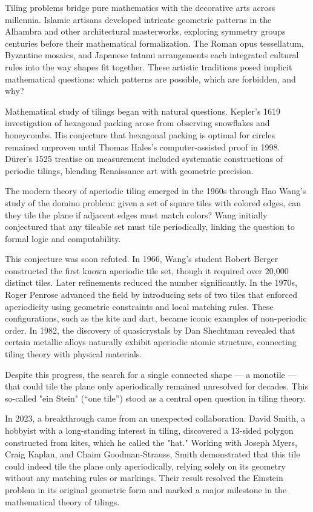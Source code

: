 \begin{historical}
Tiling problems bridge pure mathematics with the decorative arts across millennia. Islamic artisans developed intricate geometric patterns in the Alhambra and other architectural masterworks, exploring symmetry groups centuries before their mathematical formalization. The Roman opus tessellatum, Byzantine mosaics, and Japanese tatami arrangements each integrated cultural rules into the way shapes fit together. These artistic traditions posed implicit mathematical questions: which patterns are possible, which are forbidden, and why?

Mathematical study of tilings began with natural questions. Kepler's 1619 investigation of hexagonal packing arose from observing snowflakes and honeycombs. His conjecture that hexagonal packing is optimal for circles remained unproven until Thomas Hales's computer-assisted proof in 1998. Dürer's 1525 treatise on measurement included systematic constructions of periodic tilings, blending Renaissance art with geometric precision.

The modern theory of aperiodic tiling emerged in the 1960s through Hao Wang's study of the domino problem: given a set of square tiles with colored edges, can they tile the plane if adjacent edges must match colors? Wang initially conjectured that any tileable set must tile periodically, linking the question to formal logic and computability.

This conjecture was soon refuted. In 1966, Wang’s student Robert Berger constructed the first known aperiodic tile set, though it required over 20,000 distinct tiles. Later refinements reduced the number significantly. In the 1970s, Roger Penrose advanced the field by introducing sets of two tiles that enforced aperiodicity using geometric constraints and local matching rules. These configurations, such as the kite and dart, became iconic examples of non-periodic order. In 1982, the discovery of quasicrystals by Dan Shechtman revealed that certain metallic alloys naturally exhibit aperiodic atomic structure, connecting tiling theory with physical materials.

Despite this progress, the search for a single connected shape — a monotile — that could tile the plane only aperiodically remained unresolved for decades. This so-called "ein Stein"  (“one tile”) stood as a central open question in tiling theory.

In 2023, a breakthrough came from an unexpected collaboration. David Smith, a hobbyist with a long-standing interest in tiling, discovered a 13-sided polygon constructed from kites, which he called the "hat." Working with Joseph Myers, Craig Kaplan, and Chaim Goodman-Strauss, Smith demonstrated that this tile could indeed tile the plane only aperiodically, relying solely on its geometry without any matching rules or markings. Their result resolved the Einstein problem in its original geometric form and marked a major milestone in the mathematical theory of tilings.
\end{historical}
